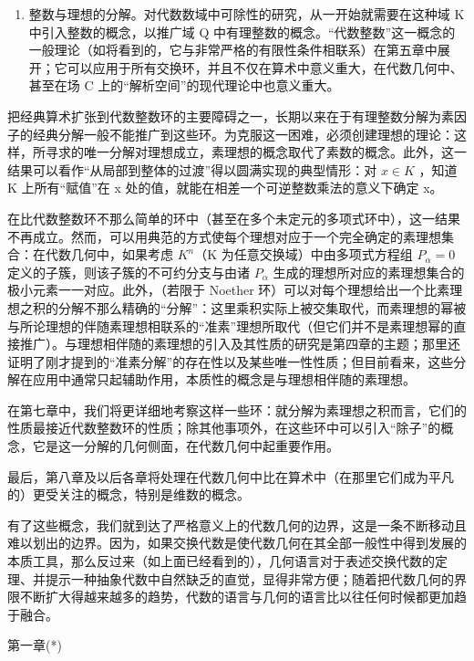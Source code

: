\begin{enumerate}
\def\labelenumi{\Roman{enumi}.}
\setcounter{enumi}{2}
\tightlist
\item
  整数与理想的分解。对代数数域中可除性的研究，从一开始就需要在这种域 K 中引入整数的概念，以推广域 Q 中有理整数的概念。“代数整数”这一概念的一般理论（如将看到的，它与非常严格的有限性条件相联系）在第五章中展开；它可以应用于所有交换环，并且不仅在算术中意义重大，在代数几何中、甚至在场 C 上的“解析空间”的现代理论中也意义重大。
\end{enumerate}

把经典算术扩张到代数整数环的主要障碍之一，长期以来在于有理整数分解为素因子的经典分解一般不能推广到这些环。为克服这一困难，必须创建理想的理论：这样，所寻求的唯一分解对理想成立，素理想的概念取代了素数的概念。此外，这一结果可以看作“从局部到整体的过渡”得以圆满实现的典型情形：对 \(x \in K\) ，知道 K 上所有“赋值”在 x 处的值，就能在相差一个可逆整数乘法的意义下确定 x。

在比代数整数环不那么简单的环中（甚至在多个未定元的多项式环中），这一结果不再成立。然而，可以用典范的方式使每个理想对应于一个完全确定的素理想集合：在代数几何中，如果考虑 \(K^{n}\)（K 为任意交换域）中由多项式方程组 \(P_{\alpha}=0\) 定义的子簇，则该子簇的不可约分支与由诸 \(P_{\alpha}\) 生成的理想所对应的素理想集合的极小元素一一对应。此外，（若限于 Noether 环）可以对每个理想给出一个比素理想之积的分解不那么精确的“分解”：这里乘积实际上被交集取代，而素理想的幂被与所论理想的伴随素理想相联系的“准素”理想所取代（但它们并不是素理想幂的直接推广）。与理想相伴随的素理想的引入及其性质的研究是第四章的主题；那里还证明了刚才提到的“准素分解”的存在性以及某些唯一性性质；但目前看来，这些分解在应用中通常只起辅助作用，本质性的概念是与理想相伴随的素理想。

在第七章中，我们将更详细地考察这样一些环：就分解为素理想之积而言，它们的性质最接近代数整数环的性质；除其他事项外，在这些环中可以引入“除子”的概念，它是这一分解的几何侧面，在代数几何中起重要作用。

最后，第八章及以后各章将处理在代数几何中比在算术中（在那里它们成为平凡的）更受关注的概念，特别是维数的概念。

有了这些概念，我们就到达了严格意义上的代数几何的边界，这是一条不断移动且难以划出的边界。因为，如果交换代数是使代数几何在其全部一般性中得到发展的本质工具，那么反过来（如上面已经看到的），几何语言对于表述交换代数的定理、并提示一种抽象代数中自然缺乏的直觉，显得非常方便；随着把代数几何的界限不断扩大得越来越多的趋势，代数的语言与几何的语言比以往任何时候都更加趋于融合。

第一章(*)

